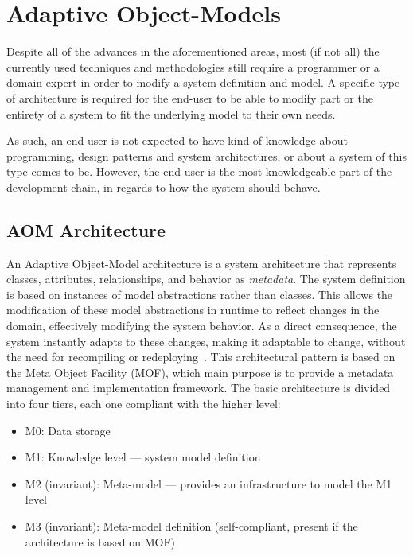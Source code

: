 \section{Adaptive Object-Models}\label{sec:aom}

Despite all of the advances in the aforementioned areas, most (if not all) the currently used techniques and methodologies still require a programmer or a domain expert in order to modify a system definition and model. A specific type of architecture is required for the end-user to be able to modify part or the entirety of a system to fit the underlying model to their own needs.

As such, an end-user is not expected to have kind of knowledge about programming, design patterns and system architectures, or about a system of this type comes to be. However, the end-user is the most knowledgeable part of the development chain, in regards to how the system should behave.

\subsection{AOM Architecture}\label{sec:aom_architecture}

An Adaptive Object-Model architecture is a system architecture that represents classes, attributes, relationships, and behavior as \emph{metadata}. The system definition is based on instances of model abstractions rather than classes. This allows the modification of these model abstractions in runtime to reflect changes in the domain, effectively modifying the system behavior. As a direct consequence, the system instantly adapts to these changes, making it adaptable to change, without the need for recompiling or redeploying~\cite{YBJ01}. This architectural pattern is based on the Meta Object Facility (MOF), which main purpose is to provide a metadata management and implementation framework. The basic architecture is divided into four tiers, each one compliant with the higher level:~\cite{mof}

\begin{itemize}
  \item M0: Data storage
  \item M1: Knowledge level --- system model definition
  \item M2 (invariant): Meta-model --- provides an infrastructure to model the M1 level
  \item M3 (invariant): Meta-model definition (self-compliant, present if the architecture is based on MOF)
\end{itemize}

